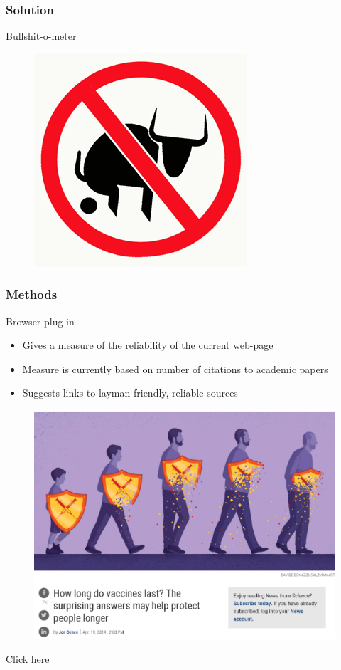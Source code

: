 \documentclass{beamer}
\begin{document}

\begin{frame} \frametitle{Solution}
	\centering
	\Huge Bullshit-o-meter
	\begin{figure}
		\includegraphics[scale=0.5]{Figures/Deja_moo.jpg}
	\end{figure}
\end{frame}


\begin{frame} \frametitle{Methods}
	Browser plug-in
	\begin{itemize}
	    \item Gives a measure of the reliability of the current web-page
	    \item Measure is currently based on number of citations to academic papers
	    \item Suggests links to layman-friendly, reliable sources
	\end{itemize}
	\begin{figure}
		\includegraphics[scale=0.2]{Figures/webpage.pdf}
	\end{figure}
	\centering
	\href{https://www.sciencemag.org/news/2019/04/how-long-do-vaccines-last-surprising-answers-may-help-protect-people-longer?fbclid=IwAR2SRI_3p9j4aUWZDTyfPYf21PUJtjwojyErQg5rbUd3S-2MSFwjSxR9kfo}{Click here}
\end{frame}
\end{document}

